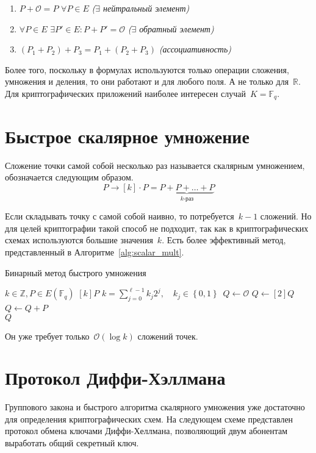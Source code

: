 \documentclass[11pt]{exam}
\theoremstyle{definition}
\begin{document}
{\begin{tcolorbox}[colframe=title-and-section-color!120, colback=title-and-section-color!5, title=Теорема, center title]
\begin{enumerate}
			\item $P + \mathcal{O} = P$ $\forall P \in E$ \hfill \textit{($\exists$ нейтральный элемент)}
			
			\item $\forall P \in E$ $\exists P' \in E: P + P' = \mathcal{O}$ \hfill \textit{($\exists$ обратный элемент)}
			
			\item $\left( P_1 + P_2 \right) + P_3 = P_1 + \left( P_2 + P_3 \right)$ \hfill \textit{(ассоциативность)}
		\end{enumerate}
	\end{tcolorbox}
	Более того, поскольку в формулах используются только операции сложения, умножения и деления, то они работают и для любого поля. А не только для~$\mathbb{R}$. Для криптографических приложений наиболее интересен случай~$K = \mathbb{F}_q$.
	
	\section{Быстрое скалярное умножение}
	Сложение точки самой собой несколько раз называется скалярным умножением, обозначается следующим образом.
	\[
	P \to \left[ k \right] \cdot P = \underbrace {P + P +  \ldots  + P}_{k{\text{-раз}}}
	\]
	
	Если складывать точку с самой собой наивно, то потребуется~$k-1$ сложений. Но для целей криптографии такой способ не подходит, так как в криптографических схемах используются большие значения~$k$. Есть более эффективный метод, представленный в Алгоритме~\ref{alg:scalar_mult}.
	
\begin{algorithm}
	\caption{Бинарный метод быстрого умножения}\label{alg:scalar_mult}
	\begin{algorithmic}
		\Require $k \in \mathbb{Z}, P \in E(\mathbb{F}_q)$
		\Ensure $[k] P$
		\State $k = \sum\limits_{j = 0}^{\ell - 1} {{k_j}{2^j}},\quad {k_j} \in \left\{ {0,1} \right\}$\
		\State $Q \gets \mathcal{O}$
			\State $Q \gets \left[ 2 \right]Q$
				\State $Q \gets Q + P$
			\EndIf
		\EndFor~\\
		\Return $Q$
	\end{algorithmic}
\end{algorithm}
Он уже требует только~$\mathcal{O}(\log k)$ сложений точек.

\section{Протокол Диффи-Хэллмана}
Группового закона и быстрого алгоритма скалярного умножения уже достаточно для определения криптографических схем. На следующем схеме представлен протокол обмена ключами Диффи-Хеллмана, позволяющий двум абонентам выработать общий секретный ключ.

}
\end{document}
